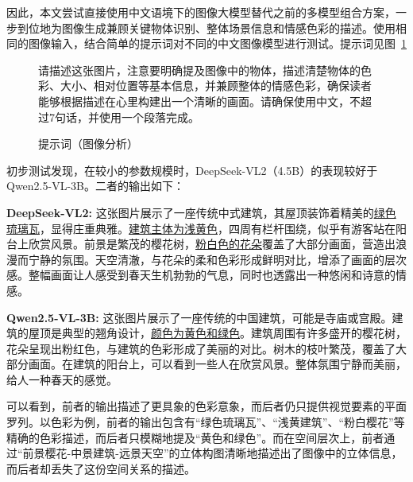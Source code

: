 因此，本文尝试直接使用中文语境下的图像大模型替代之前的多模型组合方案，一步到位地为图像生成兼顾关键物体识别、整体场景信息和情感色彩的描述。使用相同的图像输入，结合简单的提示词对不同的中文图像模型进行测试。提示词见图~\ref{fig:prompt_image_analysis}

\begin{figure}[ht]
  \begin{tcolorbox}[
      colback=white, %
      colframe=black, 
      boxrule=1pt,        %
      arc=0mm             %
      ]
      \kaishu 请描述这张图片，注意要明确提及图像中的物体，描述清楚物体的色彩、大小、相对位置等基本信息，并兼顾整体的情感色彩，确保读者能够根据描述在心里构建出一个清晰的画面。请确保使用中文，不超过7句话，并使用一个段落完成。
  \end{tcolorbox}
  \caption{提示词（图像分析）}
  \label{fig:prompt_image_analysis} %
\end{figure}


初步测试发现，在较小的参数规模时，DeepSeek-VL2（4.5B）的表现较好于Qwen2.5-VL-3B。二者的输出如下：%

{\kaishu 
\textbf{DeepSeek-VL2:} 这张图片展示了一座传统中式建筑，其屋顶装饰着精美的\underline{绿色琉璃瓦}，显得庄重典雅。\underline{建筑主体为浅黄色}，四周有栏杆围绕，似乎有游客站在阳台上欣赏风景。前景是繁茂的樱花树，\underline{粉白色的花朵}覆盖了大部分画面，营造出浪漫而宁静的氛围。天空清澈，与花朵的柔和色彩形成鲜明对比，增添了画面的层次感。整幅画面让人感受到春天生机勃勃的气息，同时也透露出一种悠闲和诗意的情感。\par
\textbf{Qwen2.5-VL-3B:} 这张图片展示了一座传统的中国建筑，可能是寺庙或宫殿。建筑的屋顶是典型的翘角设计，\underline{颜色为黄色和绿色}。建筑周围有许多盛开的樱花树，花朵呈现出粉红色，与建筑的色彩形成了美丽的对比。树木的枝叶繁茂，覆盖了大部分画面。在建筑的阳台上，可以看到一些人在欣赏风景。整体氛围宁静而美丽，给人一种春天的感觉。\par
}
可以看到，前者的输出描述了更具象的色彩意象，而后者仍只提供视觉要素的平面罗列。以色彩为例，前者的输出包含有“绿色琉璃瓦”、“浅黄建筑”、“粉白樱花”等精确的色彩描述，而后者只模糊地提及“黄色和绿色”。而在空间层次上，前者通过“前景樱花-中景建筑-远景天空”的立体构图清晰地描述出了图像中的立体信息，而后者却丢失了这份空间关系的描述。


